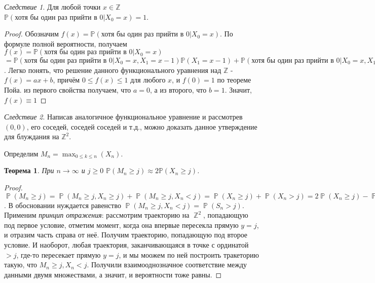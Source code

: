\documentclass[a4paper,100pt]{article}
\theoremstyle{indented}
\newtheorem{theorem}{Теорема}
\theoremstyle{definition}
\theoremstyle{remark}
\newtheorem{cons}{Следствие}
\DeclareMathOperator{\ZZ}{\mathbb{Z}}
\DeclareMathOperator{\PP}{\mathbb{P}}
\begin{document}
\begin{cons}
  Для любой точки $x \in \mathbb{Z}$ $\mathbb{P}(\text{хотя бы один раз прийти в 0} | X_0=x)=1$.
\end{cons}

\begin{proof}
  Обозначим $f(x)=\mathbb{P}(\text{хотя бы один раз прийти в 0} | X_0=x)$. По формуле полной вероятности, получаем $f(x)=\mathbb{P}(\text{хотя бы один раз прийти в 0} | X_0=x)$ $=\mathbb{P}(\text{хотя бы один раз прийти в 0} | X_0=x, X_1=x-1) \mathbb{P}(X_1=x-1)+\mathbb{P}(\text{хотя бы один раз прийти в 0} | X_0=x, X_1=x+1) \mathbb{P}(X_1=x+1)=\frac{1}{2}(f(x-1)+f(x+1))$. Легко понять, что решение данного функционального уравнения над $\mathbb{Z}$ - $f(x)=ax+b$, причём $0 \leq f(x) \leq 1$ для любого $x$, и $f(0)=1$ по теореме Пойа. из первого свойства получаем, что $a=0$, а из второго, что $b=1$. Значит, $f(x) \equiv 1$
\end{proof}

\begin{cons}
  Написав аналогичное функциональное уравнение и рассмотрев $(0, 0)$, его соседей, соседей соседей и т.д., можно доказать данное утверждение для блуждания на $\mathbb{Z}^2$.
\end{cons}

Определим $M_n=\max_{0 \leq k \leq n} (X_n)$. \\

\begin{theorem}
  При $n \rightarrow \infty$ и $j \geq 0$ $\mathbb{P}(M_n \geq j) \approx 2 \mathbb{P}(X_n \geq j)$.
\end{theorem}

\begin{proof}
  $\PP(M_n \geq j) = \PP(M_n \geq j, X_n \geq j)+\PP(M_n \geq j, X_n <j) = \PP(X_n \geq j)+\PP(X_n>j)=2\PP(X_n \geq j)-\PP(X_n)=j \approx 2\PP(X_n \geq j)$. В обосновании нуждается равенство $\PP(M_n \geq j, X_n <j)=\PP(S_n>j)$. Применим \textit{принцип отражения}: рассмотрим траекторию на $\ZZ^2$, попадающую под первое условие, отметим момент, когда она впервые пересекла прямую $y=j$, и отразим часть справа от неё. Получим траекторию, попадающую под второе условие. И наоборот, любая траектория, заканчивающаяся в точке с ординатой $> j$, где-то пересекает прямую $y=j$, и мы моожем по ней построить тракеторию такую, что $M_n \geq j, X_n <j$. Получили взаимооднозначное соответствие между данными двумя множествами, а значит, и вероятности тоже равны.
\end{proof}
\end{document}
